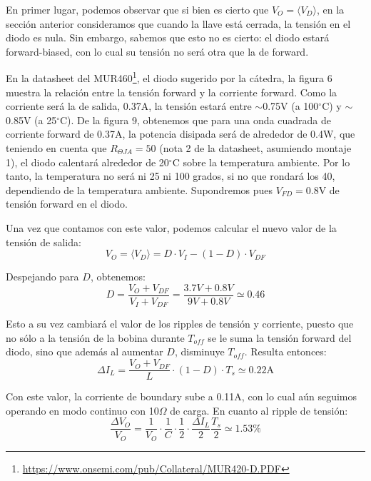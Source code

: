 \documentclass[e4_tp1_main.tex]{subfiles}
\begin{document}
En primer lugar, podemos observar que si bien es cierto que $V_O = \langle V_D \rangle$, en la secci\'on anterior consideramos que cuando la llave est\'a cerrada, la tensi\'on en el diodo es nula. Sin embargo, sabemos que esto no es cierto: el diodo estar\'a forward-biased, con lo cual su tensi\'on no ser\'a otra que la de forward. 

En la datasheet del 
MUR460\footnote{
	\url{https://www.onsemi.com/pub/Collateral/MUR420-D.PDF}
}, el diodo sugerido por la c\'atedra, la figura 6 muestra la relaci\'on entre la tensi\'on forward y la corriente forward. Como la corriente ser\'a la de salida, 0.37A, la tensi\'on estar\'a entre $\sim$0.75V (a 100$^\circ$C) y 
$\sim$0.85V (a 25$^\circ$C). 
De la figura 9, obtenemos que para una onda cuadrada de corriente forward de 0.37A, la potencia disipada ser\'a de alrededor de 0.4W, que teniendo en cuenta que $R_{\Theta JA}=50$ (nota 2 de la datasheet, asumiendo montaje 1), el diodo calentar\'a alrededor de 20$^\circ$C sobre la temperatura ambiente. Por lo tanto, la temperatura no ser\'a ni 25 ni 100 grados, si no que rondar\'a los 40, dependiendo de la temperatura ambiente. Supondremos pues $V_{FD}= 0.8$V de tensi\'on forward en el diodo.

Una vez que contamos con este valor, podemos calcular el nuevo valor de la tensi\'on de salida: 
\begin{equation}
	V_O = \langle V_D \rangle = D \cdot V_I - (1-D) \cdot V_{DF}   
\end{equation}

Despejando para $D$, obtenemos:
\begin{equation}
	D = \frac{V_O + V_{DF}}{V_I + V_{DF}} 
	= \frac{3.7V + 0.8V}{9V + 0.8V} 
	\simeq 0.46 
\end{equation}

Esto a su vez cambiar\'a el valor de los ripples de tensi\'on y corriente, puesto que no s\'olo a la tensi\'on de la bobina durante $T_{off}$ se le suma la tensi\'on forward del diodo, sino que adem\'as al aumentar $D$, disminuye $T_{off}$. Resulta entonces: 
\begin{equation}
	\Delta I_L = \frac{V_O + V_{DF}}{L} \cdot (1-D) \cdot T_s
	\simeq 0.22\text{A}
\end{equation} 

Con este valor, la corriente de boundary sube a 0.11A, con lo cual a\'un seguimos operando en modo continuo con 10$\Omega$ de carga. En cuanto al ripple de tensi\'on:
\begin{equation}
\frac{\Delta V_O}{V_O}  
= \frac{1}{V_O} 
\cdot \frac{1}{C} \cdot \frac{1}{2} \cdot \frac{\Delta I_L}{2} \frac{T_s}{2}
\simeq 1.53 \%
\label{eq:result-ripple-diodo}
\end{equation}
\end{document}
